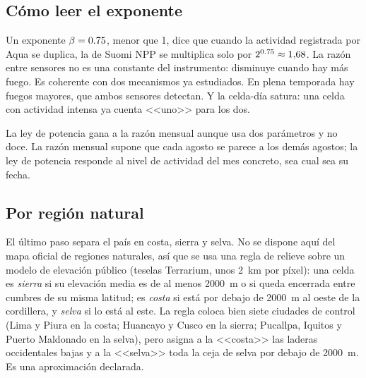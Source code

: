 \subsection{Cómo leer el exponente}

Un exponente $\beta = \num{0.75}$, menor que 1, dice que cuando la actividad registrada
por Aqua se duplica, la de Suomi NPP se multiplica solo por $2^{\num{0.75}} \approx 1{,}68$.
La razón entre sensores no es una constante del instrumento: disminuye cuando hay más fuego.
Es coherente con dos mecanismos ya estudiados. En plena temporada hay fuegos mayores, que
ambos sensores detectan. Y la celda-día satura: una celda con actividad intensa ya cuenta
<<uno>> para los dos.

La ley de potencia gana a la razón mensual aunque usa dos parámetros y no doce. La razón
mensual supone que cada agosto se parece a los demás agostos; la ley de potencia responde
al nivel de actividad del mes concreto, sea cual sea su fecha.

\subsection{Por región natural}

El último paso separa el país en costa, sierra y selva. No se dispone aquí del mapa oficial
de regiones naturales, así que se usa una regla de relieve sobre un modelo de elevación
público (teselas Terrarium, unos 2~km por píxel): una celda es \emph{sierra} si su elevación
media es de al menos 2000~m o si queda encerrada entre cumbres de su misma latitud; es
\emph{costa} si está por debajo de 2000~m al oeste de la cordillera, y \emph{selva} si lo está
al este. La regla coloca bien siete ciudades de control (Lima y Piura en la costa; Huancayo y
Cusco en la sierra; Pucallpa, Iquitos y Puerto Maldonado en la selva), pero asigna a la
<<costa>> las laderas occidentales bajas y a la <<selva>> toda la ceja de selva por debajo de
2000~m. Es una aproximación declarada.

